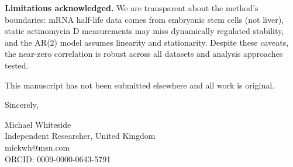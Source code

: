 \documentclass[11pt,letterpaper]{article}
\begin{document}
\vspace{0.3cm}

\textbf{Limitations acknowledged.} We are transparent about the method's boundaries: mRNA half-life data comes from embryonic stem cells (not liver), static actinomycin D measurements may miss dynamically regulated stability, and the AR(2) model assumes linearity and stationarity. Despite these caveats, the near-zero correlation is robust across all datasets and analysis approaches tested.

\vspace{0.3cm}

This manuscript has not been submitted elsewhere and all work is original.

\vspace{0.5cm}

Sincerely,

\vspace{0.5cm}

Michael Whiteside \\
Independent Researcher, United Kingdom \\
mickwh@msn.com \\
ORCID: 0009-0000-0643-5791
\end{document}
